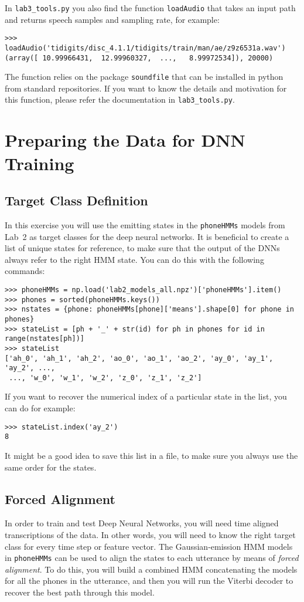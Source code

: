 \documentclass{nada-ten}
\begin{document}
In \texttt{lab3\_tools.py} you also find the function \texttt{loadAudio} that takes an input path and returns speech samples and sampling rate, for example:
\begin{verbatim}
>>> loadAudio('tidigits/disc_4.1.1/tidigits/train/man/ae/z9z6531a.wav')
(array([ 10.99966431,  12.99960327,  ...,   8.99972534]), 20000)
\end{verbatim}
The function relies on the package \texttt{soundfile} that can be installed in python from standard repositories.
If you want to know the details and motivation for this function, please refer the documentation in \texttt{lab3\_tools.py}.

\section{Preparing the Data for DNN Training}
\label{sec:datapreparation}
\subsection{Target Class Definition}
In this exercise you will use the emitting states in the \texttt{phoneHMMs} models from Lab~2 as target classes for the deep neural networks. It is beneficial to create a list of unique states for reference, to make sure that the output of the DNNs always refer to the right HMM state. You can do this with the following commands:
\begin{verbatim}
>>> phoneHMMs = np.load('lab2_models_all.npz')['phoneHMMs'].item()
>>> phones = sorted(phoneHMMs.keys())
>>> nstates = {phone: phoneHMMs[phone]['means'].shape[0] for phone in phones}
>>> stateList = [ph + '_' + str(id) for ph in phones for id in range(nstates[ph])]
>>> stateList
['ah_0', 'ah_1', 'ah_2', 'ao_0', 'ao_1', 'ao_2', 'ay_0', 'ay_1', 'ay_2', ..., 
 ..., 'w_0', 'w_1', 'w_2', 'z_0', 'z_1', 'z_2']
\end{verbatim}
If you want to recover the numerical index of a particular state in the list, you can do for example:
\begin{verbatim}
>>> stateList.index('ay_2')
8
\end{verbatim}
It might be a good idea to save this list in a file, to make sure you always use the same order for the states.

\subsection{Forced Alignment}
\label{sec:forcedalignment}
In order to train and test Deep Neural Networks, you will need time aligned transcriptions of the data. In other words, you will need to know the right target class for every time step or feature vector. The Gaussian-emission HMM models in \texttt{phoneHMMs} can be used to align the states to each utterance by means of \textit{forced alignment}.
To do this, you will build a combined HMM concatenating the models for all the phones in the utterance, and then you will run the Viterbi decoder to recover the best path through this model.
\end{document}
